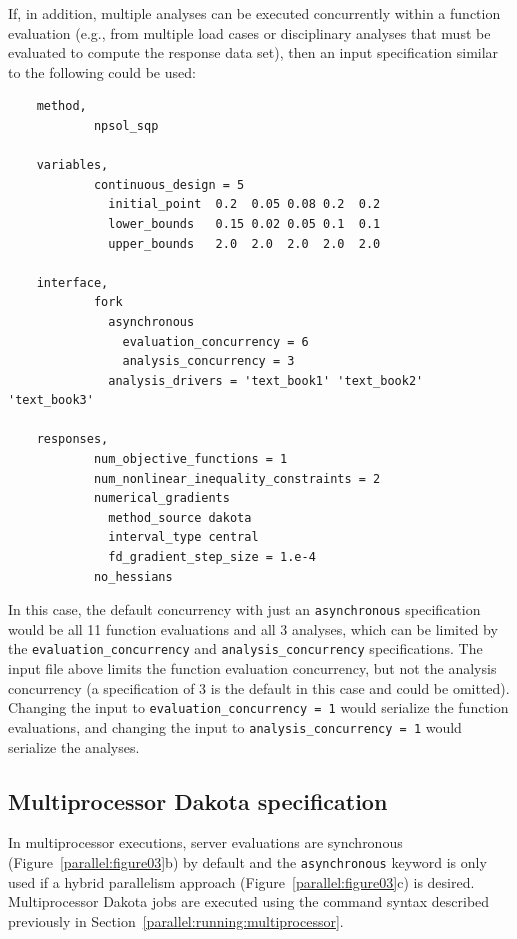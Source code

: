 If, in addition, multiple analyses can be executed concurrently within
a function evaluation (e.g., from multiple load cases or disciplinary
analyses that must be evaluated to compute the response data set),
then an input specification similar to the following could be used:
\begin{small}
\begin{verbatim}
    method,
            npsol_sqp

    variables,
            continuous_design = 5
              initial_point  0.2  0.05 0.08 0.2  0.2
              lower_bounds   0.15 0.02 0.05 0.1  0.1
              upper_bounds   2.0  2.0  2.0  2.0  2.0

    interface,
            fork
              asynchronous
                evaluation_concurrency = 6
                analysis_concurrency = 3
              analysis_drivers = 'text_book1' 'text_book2' 'text_book3'

    responses,
            num_objective_functions = 1
            num_nonlinear_inequality_constraints = 2
            numerical_gradients
              method_source dakota
              interval_type central
              fd_gradient_step_size = 1.e-4
            no_hessians
\end{verbatim}
\end{small}

In this case, the default concurrency with just an
\texttt{asynchronous} specification would be all 11 function
evaluations and all 3 analyses, which can be limited by the
\texttt{evaluation\_concurrency} and \texttt{analysis\_concurrency}
specifications. The input file above limits the function evaluation
concurrency, but not the analysis concurrency (a specification of 3 is
the default in this case and could be omitted). Changing the input to
\texttt{evaluation\_concurrency = 1} would serialize the function
evaluations, and changing the input to \texttt{analysis\_concurrency = 1}
would serialize the analyses.

\subsection{Multiprocessor Dakota specification}\label{parallel:spec:multi}

In multiprocessor executions, server evaluations are synchronous
(Figure~\ref{parallel:figure03}b) by default and the
\texttt{asynchronous} keyword is only used if a hybrid parallelism
approach (Figure~\ref{parallel:figure03}c) is desired. Multiprocessor
Dakota jobs are executed using the command syntax described previously
in Section~\ref{parallel:running:multiprocessor}.

